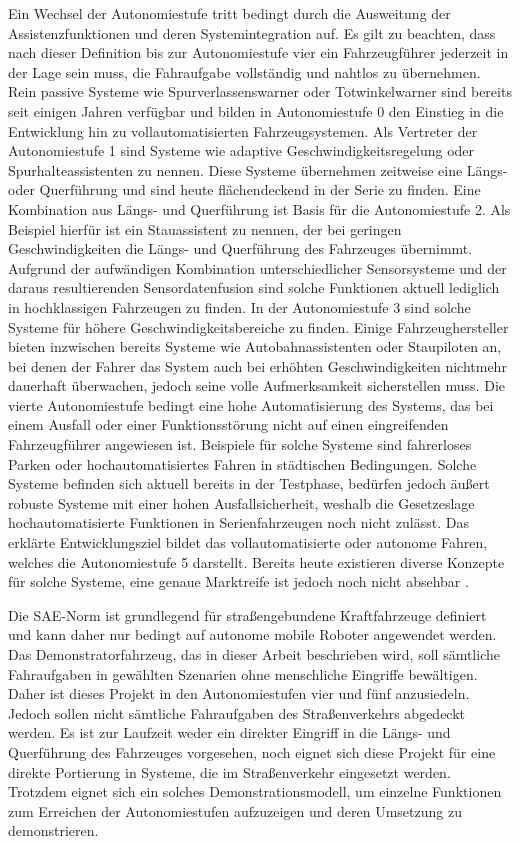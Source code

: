 Ein Wechsel der Autonomiestufe tritt bedingt durch die Ausweitung der Assistenzfunktionen und deren Systemintegration auf. Es gilt zu beachten, dass nach dieser Definition bis zur Autonomiestufe vier ein Fahrzeugführer jederzeit in der Lage sein muss, die Fahraufgabe vollständig und nahtlos zu übernehmen.\\
Rein passive Systeme wie Spurverlassenswarner oder Totwinkelwarner sind bereits seit einigen Jahren verfügbar und bilden in Autonomiestufe 0 den Einstieg in die Entwicklung hin zu vollautomatisierten Fahrzeugsystemen. Als Vertreter der Autonomiestufe 1 sind Systeme wie adaptive Geschwindigkeitsregelung oder Spurhalteassistenten zu nennen. Diese Systeme übernehmen zeitweise eine Längs- oder Querführung und sind heute flächendeckend in der Serie zu finden. Eine Kombination aus Längs- und Querführung ist Basis für die Autonomiestufe 2. Als Beispiel hierfür ist ein Stauassistent zu nennen, der bei geringen Geschwindigkeiten die Längs- und Querführung des Fahrzeuges übernimmt. Aufgrund der aufwändigen Kombination unterschiedlicher Sensorsysteme und der daraus resultierenden Sensordatenfusion sind solche Funktionen aktuell lediglich in hochklassigen Fahrzeugen zu finden. In der Autonomiestufe 3 sind solche Systeme für höhere Geschwindigkeitsbereiche zu finden. Einige Fahrzeughersteller bieten inzwischen bereits Systeme wie Autobahnassistenten oder Staupiloten an, bei denen der Fahrer das System auch bei erhöhten Geschwindigkeiten nichtmehr dauerhaft überwachen, jedoch seine volle Aufmerksamkeit sicherstellen muss. Die vierte Autonomiestufe bedingt eine hohe Automatisierung des Systems, das bei einem Ausfall oder einer Funktionsstörung nicht auf einen eingreifenden Fahrzeugführer angewiesen ist. Beispiele für solche Systeme sind fahrerloses Parken oder hochautomatisiertes Fahren in städtischen Bedingungen. Solche Systeme befinden sich aktuell bereits in der Testphase, bedürfen jedoch äußert robuste Systeme mit einer hohen Ausfallsicherheit, weshalb die Gesetzeslage hochautomatisierte Funktionen in Serienfahrzeugen noch nicht zulässt. Das erklärte Entwicklungsziel bildet das vollautomatisierte oder autonome Fahren, welches die Autonomiestufe 5 darstellt. Bereits heute existieren diverse Konzepte für solche Systeme, eine genaue Marktreife ist jedoch noch nicht absehbar \cite{ADACe.V..2018,VerbandderAutomibilindustriee.V..2015}. 

Die \acs{SAE}-Norm ist grundlegend für straßengebundene Kraftfahrzeuge definiert und kann daher nur bedingt auf autonome mobile Roboter angewendet werden. Das Demonstratorfahrzeug, das in dieser Arbeit beschrieben wird, soll sämtliche Fahraufgaben in gewählten Szenarien ohne menschliche Eingriffe bewältigen. Daher ist dieses Projekt in den Autonomiestufen vier und fünf anzusiedeln. Jedoch sollen nicht sämtliche Fahraufgaben des Straßenverkehrs abgedeckt werden. Es ist zur Laufzeit weder ein direkter Eingriff in die Längs- und Querführung des Fahrzeuges vorgesehen, noch eignet sich diese Projekt für eine direkte Portierung in Systeme, die im Straßenverkehr eingesetzt werden. Trotzdem eignet sich ein solches Demonstrationsmodell, um einzelne Funktionen zum Erreichen der Autonomiestufen aufzuzeigen und deren Umsetzung zu demonstrieren. 


